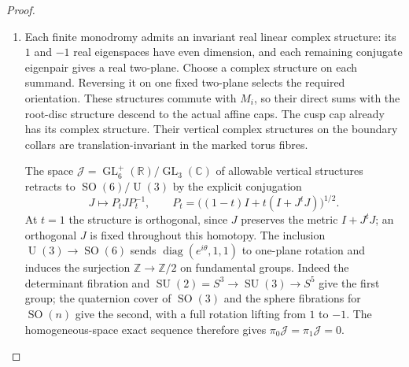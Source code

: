 \documentclass[11pt,a4paper]{article}
\theoremstyle{definition}
\begin{document}
\begin{proof}
\begin{enumerate}[label=\arabic*.]
These ranks determine the cohomology: $H^0$ of the image sheaf is
$\mathbb Q$ in coefficient degree one, $H^1$ is $\mathbb Q^3$ in
coefficient degree three, and every other entry in these four
coefficient degrees is zero. The cusp skyscraper kernel adds
$\mathbb Q$ to $H^0(R^4\pi_*\mathbb Q)$ and no higher cohomology.
Connected fibres give $R^0\pi_*\mathbb Q=\mathbb Q$.

In the Leray sequence
\cite[Tag 01F2, Lemma 20.13.4; chapter PDF p.~22]{StacksProject},
the only remaining low-degree differential is
$d_2^{0,1}:\mathbb Q\to\mathbb Q$. Its kernel is $H^1(M;\mathbb Q)=0$
by Step~2, so it is an isomorphism. Hence
$b_1=b_2=b_3=0$ and $b_4=3+1=4$. Poincar\'e duality determines all
remaining Betti numbers and gives \eqref{maps:eq:F.5}. Also, the
smooth and finite quotient fibres have Euler number zero, while the
Kuhn cusp has Euler number six by Theorem~\ref{night:P1.9}. Additivity
over the base strata therefore gives $\chi(M)=6$ directly.

\item Each finite monodromy admits an invariant real linear complex
structure: its $1$ and $-1$ real eigenspaces have even dimension, and
each remaining conjugate eigenpair gives a real two-plane. Choose
a complex structure on each summand. Reversing it on one fixed
two-plane selects the required orientation. These structures commute
with $M_i$, so their direct sums with the root-disc structure descend
to the actual affine caps. The cusp cap already has its complex
structure. Their vertical complex structures on the boundary collars
are translation-invariant in the marked torus fibres.

The space $\mathcal J=\operatorname{GL}_6^+(\mathbb R)/
\operatorname{GL}_3(\mathbb C)$ of allowable vertical structures
retracts to $\operatorname{SO}(6)/\operatorname{U}(3)$ by the explicit
conjugation
\[
 J\longmapsto P_tJP_t^{-1},
 \qquad P_t=\bigl((1-t)I+t(I+J^tJ)\bigr)^{1/2}.
\]
At $t=1$ the structure is orthogonal, since $J$ preserves the metric
$I+J^tJ$; an orthogonal $J$ is fixed throughout this homotopy.
The inclusion $\operatorname{U}(3)\to\operatorname{SO}(6)$ sends
$\operatorname{diag}(e^{i\theta},1,1)$ to one-plane rotation and
induces the surjection $\mathbb Z\to\mathbb Z/2$ on fundamental
groups. Indeed the determinant fibration and
$\operatorname{SU}(2)=S^3\to\operatorname{SU}(3)\to S^5$ give the
first group; the quaternion cover of $\operatorname{SO}(3)$ and
the sphere fibrations for $\operatorname{SO}(n)$ give the second,
with a full rotation lifting from $1$ to $-1$. The homogeneous-space
exact sequence therefore gives $\pi_0\mathcal J=\pi_1\mathcal J=0$.


\end{enumerate}
\end{proof}
\end{document}

